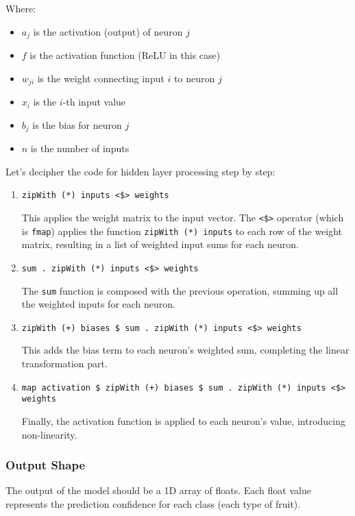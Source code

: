 \documentclass[12pt,a4paper]{article}
\begin{document}
Where:
\begin{itemize}
    \item $a_j$ is the activation (output) of neuron $j$
    \item $f$ is the activation function (ReLU in this case)
    \item $w_{ji}$ is the weight connecting input $i$ to neuron $j$
    \item $x_i$ is the $i$-th input value
    \item $b_j$ is the bias for neuron $j$
    \item $n$ is the number of inputs
\end{itemize}

Let's decipher the code for hidden layer processing step by step:

\begin{enumerate}
    \item \texttt{zipWith (*) inputs <\$> weights}
    
    This applies the weight matrix to the input vector. The \texttt{<\$>} operator (which is \texttt{fmap}) applies the function \texttt{zipWith (*) inputs} to each row of the weight matrix, resulting in a list of weighted input sums for each neuron.
    
    \item \texttt{sum . zipWith (*) inputs <\$> weights}
    
    The \texttt{sum} function is composed with the previous operation, summing up all the weighted inputs for each neuron.
    
    \item \texttt{zipWith (+) biases \$ sum . zipWith (*) inputs <\$> weights}
    
    This adds the bias term to each neuron's weighted sum, completing the linear transformation part.
    
    \item \texttt{map activation \$ zipWith (+) biases \$ sum . zipWith (*) inputs <\$> weights}
    
    Finally, the activation function is applied to each neuron's value, introducing non-linearity.
\end{enumerate}

\subsubsection{Output Shape}
The output of the model should be a 1D array of floats. Each float value represents the prediction confidence for each class (each type of fruit).
\end{document}
